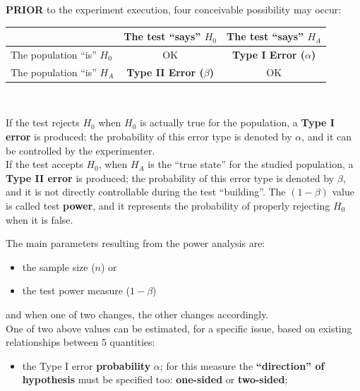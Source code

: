 \begin{frame}
  \begin{small}
    \textbf{PRIOR} to the experiment execution, four conceivable possibility may occur:\\
    \vspace*{.25cm}
    \begin{center}
      \begin{tabular}{|l|c|c|}
        \cline{2-3}
        \multicolumn{1}{c|}{} & The test ``says'' $H_0$ & The test ``says'' $ H_A $ \\
        \hline
        The population ``is'' $H_0$ & OK & \textbf{Type I Error (}{\boldmath$\alpha$}\textbf{)}\\
        \hline
        The population ``is'' $ H_A $ & \textbf{Type II Error (}{\boldmath$\beta$}\textbf{)}   & OK \\
        \hline
      \end{tabular}\\
    \end{center}
    \vspace*{.5cm}
    If the test rejects $H_0$ when $H_0$ is actually true for the population, a \textbf{Type I error} is produced; the probability of this error type is denoted by  {\boldmath$\alpha$}, and it can be controlled by the experimenter.\\
    \vspace*{.25cm}
    If the test accepts $H_0$, when $ H_A $ is the ``true state'' for the studied population, a \textbf{Type II error} is produced; the probability of this error type is denoted by {\boldmath$\beta$}, and it is not directly controllable during the test ``building''. The {\boldmath$(1-\beta)$} value is called test \textbf{power}, and it represents the probability of properly rejecting $H_0$ when it is false.\\
  \end{small}
\end{frame}

\begin{frame}
  \vspace*{.25cm}
  The main parameters resulting from the power analysis are:
  \begin{itemize}
    \item the sample size ({\boldmath $ n $}) or
    \item the test power measure ({\boldmath$1-\beta$})
  \end{itemize}
  and when one of two changes, the other changes accordingly.\\
  \vspace*{.75cm}
  One of two above values can be estimated, for a specific issue, based on existing relationships between 5 quantities:
  \vspace*{.5cm}
  \begin{itemize}
    \item the Type I error \textbf{probability} {\boldmath${\alpha}$}; for this measure the \textbf{``direction'' of  hypothesis} must be specified too: \textbf{one-sided} or \textbf{two-sided};
  \end{itemize}
\end{frame}

